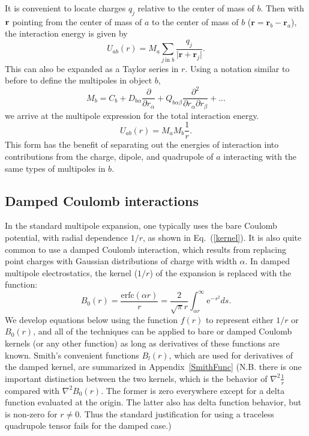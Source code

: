 It is convenient to locate charges $q_j$ relative to the center of mass of  $b$.  Then with $\bf{r}$ pointing from
the center of mass of $a$ to the center of mass of $b$ ($\mathbf{r}=\mathbf{r}_b - \mathbf{r}_a $), the interaction energy is given by
\begin{equation}
U_{ab}(r)
= M_a \sum_{j \, \text{in } b} \frac {q_j}{\vert \mathbf{r}+\mathbf{r}_j \vert} .
\end{equation}
This can also be expanded as a Taylor series in $r$.  Using a notation
similar to before to define the multipoles in object  $b$,
\begin{equation}
M_b = C_b + D_{b\alpha} \frac{\partial}{\partial r_{\alpha}} 
+   Q_{b\alpha\beta}
 \frac{\partial^2}{\partial r_{\alpha} \partial r_{\beta}} + \dots
\end{equation}
we arrive at the multipole expression for the total interaction energy.
\begin{equation}
U_{ab}(r)=M_a M_b \frac{1}{r}  \label{kernel}.
\end{equation}
This form has the benefit of separating out the energies of
interaction into contributions from the charge, dipole, and quadrupole
of $a$ interacting with the same types of multipoles in $b$.

\subsection{Damped Coulomb interactions}
\label{sec:damped}
In the standard multipole expansion, one typically uses the bare
Coulomb potential, with radial dependence $1/r$, as shown in
Eq.~(\ref{kernel}).  It is also quite common to use a damped Coulomb
interaction, which results from replacing point charges with Gaussian
distributions of charge with width $\alpha$.  In damped multipole
electrostatics, the kernel ($1/r$) of the expansion is replaced with
the function:
\begin{equation}
B_0(r)=\frac{\text{erfc}(\alpha r)}{r} = \frac{2}{\sqrt{\pi}r}
\int_{\alpha r}^{\infty} \text{e}^{-s^2} ds .
\end{equation}
We develop equations below using the function $f(r)$ to represent
either $1/r$ or $B_0(r)$, and all of the techniques can be applied to
bare or damped Coulomb kernels (or any other function) as long as
derivatives of these functions are known.  Smith's convenient
functions $B_l(r)$, which are used for derivatives of the damped
kernel, are summarized in Appendix~\ref{SmithFunc} (N.B. there is one important
distinction between the two kernels, which is the behavior of
$\nabla^2 \frac{1}{r}$ compared with $\nabla^2 B_0(r)$.  The former is
zero everywhere except for a delta function evaluated at the origin.
The latter also has delta function behavior, but is non-zero for $r
\neq 0$.  Thus the standard justification for using a traceless
quadrupole tensor fails for the damped case.)

